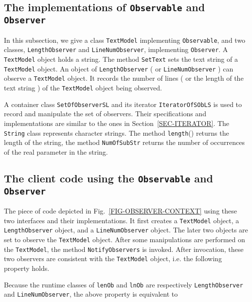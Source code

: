 \documentclass[fleqn]{llncs}
\begin{document}
\subsection{The implementations of \texttt{Observable} and \texttt{Observer}}
In this subsection, we give a class \texttt{TextModel} implementing \texttt{Observable}, and two classes, \texttt{LengthObserver}
and \texttt{LineNumObserver}, implementing \texttt{Observer}.
A \texttt{TextModel} object holds a string. The method \texttt{SetText} sets the text string of a \texttt{TextModel} object.
An object of \texttt{LengthObserver} ( or \texttt{LineNumObserver} ) can observe a \texttt{TextModel} object.
It records the number of lines ( or the length of the text string ) of the \texttt{TextModel} object being observed.

A container class \texttt{SetOfObserverSL} and its iterator \texttt{IteratorOfSObLS} is used to record and manipulate the set of observers.
Their specifications and implementations are similar to the ones in Section~\ref{SEC-ITERATOR}. The \texttt{String} class represents
character strings. The method \texttt{length}() returns the length of the string, the method \texttt{NumOfSubStr} returns the number of occurrences of the real parameter
in the string.



\subsection{The client code using the \texttt{Observable} and \texttt{Observer}}
The piece of code depicted in Fig.~\ref{FIG-OBSERVER-CONTEXT} using these two interfaces and their implementations.
It first creates a \texttt{TextModel} object, a \texttt{LengthObserver} object, and a \texttt{LineNumObserver} object.
The later two objects are set to observe the \texttt{TextModel} object.
After some manipulations are performed on the \texttt{TextModel}, the method \texttt{NotifyObservers} is invoked.
After invocation, these two observers are consistent with the \texttt{TextModel} object, i.e. the following property holds.

Because the runtime classes of \texttt{lenOb} and \texttt{lnOb} are respectively \texttt{LengthObserver} and \texttt{LineNumObserver}, the above
property is equivalent to
\end{document}
